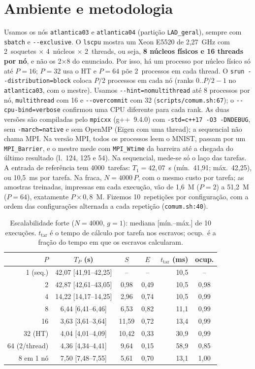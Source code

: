 \documentclass[10pt,a4paper,twocolumn]{article}
\newcommand{\cod}[1]{\texttt{\small #1}}
\begin{document}
\section{Ambiente e metodologia}
Usamos os nós \cod{atlantica03} e \cod{atlantica04} (partição \cod{LAD\_geral}), sempre com
\cod{sbatch} e \cod{-{}-exclusive}. O \cod{lscpu} mostra um Xeon E5520 de 2,27~GHz com 2~soquetes
$\times$ 4~núcleos $\times$ 2~threads, ou seja, \textbf{8 núcleos físicos e 16 threads por nó},
e não os 2$\times$8 do enunciado. Por isso, há um processo por núcleo físico só até $P=16$;
$P=32$ usa o HT e $P=64$ põe 2~processos em cada thread.
O \cod{srun -{}-distribution=block} coloca $P/2$ processos em cada nó (ranks $0..P/2-1$ no
\cod{atlantica03}, com o mestre). Usamos \cod{-{}-hint=nomultithread} até 8 processos por nó,
\cod{multithread} com 16 e \cod{-{}-overcommit} com 32 (\cod{scripts/comum.sh:67}); o
\cod{-{}-cpu-bind=verbose} confirmou uma CPU diferente para cada rank.
As duas versões são compiladas pelo \cod{mpicxx} (g++~9.4.0) com \cod{-std=c++17 -O3 -DNDEBUG},
sem \cod{-march=native} e sem OpenMP (Eigen com uma thread); a sequencial não chama MPI.
Na versão MPI, todos os processos leem o MNIST, passam por um \cod{MPI\_Barrier}, e o mestre
mede com \cod{MPI\_Wtime} da barreira até a chegada do último resultado (l.~124, 125 e 54).
Na sequencial, mede-se só o laço das tarefas. A entrada de referência tem 4000~tarefas:
$T_1=42{,}07$~s (mín.~41,91; máx.~42,25), ou 10,5~ms por tarefa. Na fraca, $N=4000\,P$, com o
mesmo custo por tarefa; as amostras treinadas, impressas em cada execução, vão de 1,6~M ($P=2$)
a 51,2~M ($P=64$), exatamente $P\times0{,}8$~M. Fizemos 10~repetições por configuração, com a
ordem das configurações alternada a cada repetição (\cod{comum.sh:40}).

\begin{table}[t]
\centering\footnotesize\setlength{\tabcolsep}{3.5pt}
\caption{Escalabilidade forte ($N=4000$, $g=1$): mediana [mín.--máx.] de 10 execuções.
$t_{\mathrm{tar}}$ é o tempo de cálculo por tarefa nos escravos; ocup.\ é a fração do tempo
em que os escravos calcularam.}
\label{tab:forte}
\begin{tabular}{@{}rcccrc@{}}
\toprule
$P$ & $T_P$ (s) & $S$ & $E$ & $t_{\mathrm{tar}}$ (ms) & ocup. \\
\midrule
1 (seq.) & 42,07 [41,91--42,25] & -- & -- & 10,5 & -- \\
2 & 42,87 [42,61--43,05] & 0,98 & 0,49 & 10,5 & 0,98 \\
4 & 14,22 [14,17--14,25] & 2,96 & 0,74 & 10,5 & 0,99 \\
8 & 6,44 [6,41--6,46] & 6,53 & 0,82 & 11,1 & 0,99 \\
16 & 3,63 [3,61--3,64] & 11,59 & 0,72 & 13,4 & 0,99 \\
32 (HT) & 4,04 [4,01--4,09] & 10,42 & 0,33 & 30,9 & 0,99 \\
64 (2/thread) & 4,36 [4,34--4,41] & 9,64 & 0,15 & 58,9 & 0,85 \\
\midrule
8 em 1 nó & 7,50 [7,48--7,55] & 5,61 & 0,70 & 13,1 & 1,00 \\
\bottomrule
\end{tabular}
\end{table}
\end{document}
